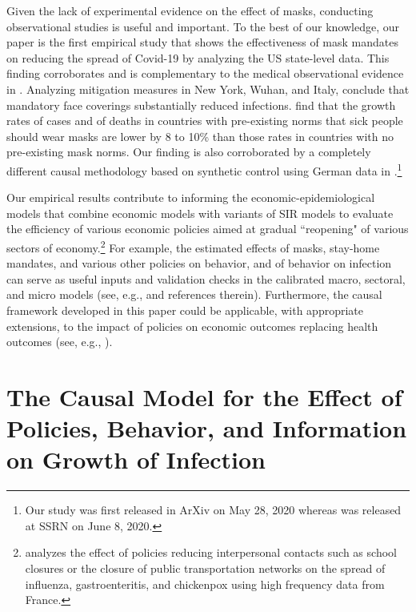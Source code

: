 \documentclass[11pt,reqno,letter]{amsart}
\theoremstyle{definition}
\begin{document}
Given the lack of experimental evidence on the effect of masks, conducting observational studies  is useful and important. To the best of our knowledge, our paper is the first  empirical study that shows the effectiveness of  mask mandates on reducing the spread of Covid-19 by analyzing the US state-level data. This finding corroborates and is complementary to the medical observational evidence in \cite{howard2020}. Analyzing mitigation measures in New York, Wuhan, and Italy, \cite{zhangr2020} conclude that mandatory face coverings substantially reduced infections. \cite{abaluck2020}  find that the growth rates of cases and of deaths in countries with pre-existing norms that sick people should wear masks are lower by 8 to 10\% than those rates in countries with no pre-existing mask norms. Our finding
is also corroborated by a completely different causal methodology based on synthetic control 
using German data in \cite{Mitze2020}.\footnote{Our study was first released in ArXiv on May 28, 2020 whereas
 \cite{Mitze2020} was released at SSRN on June 8, 2020.}

Our empirical results contribute to informing the economic-epidemiological models that combine economic models with variants of SIR models to evaluate the efficiency of various economic policies aimed at gradual ``reopening" of various sectors of economy.\footnote{\cite{adda2016} analyzes the effect of policies reducing interpersonal contacts such as school closures or the closure of public transportation networks on the spread of  influenza, gastroenteritis, and chickenpox using high frequency data from France.} For example, the estimated effects of masks, stay-home mandates, and various other policies on behavior, and of behavior on infection can serve as useful inputs and validation checks in the calibrated macro, sectoral, and micro models (see, e.g., \cite{alvarez2020simple,baqaee2020reopening,NBERw27128,acemoglu2020multi,lsmith,nashSIR} and references therein). Furthermore, the causal framework developed in this paper could be applicable, with appropriate extensions, to the impact of policies on economic outcomes replacing health outcomes (see, e.g., \cite{chetty2020real,coibion2020labor}).



\section{The Causal Model for the Effect of Policies, Behavior, and Information on Growth of Infection}\label{sec:causal-model}
\end{document}
